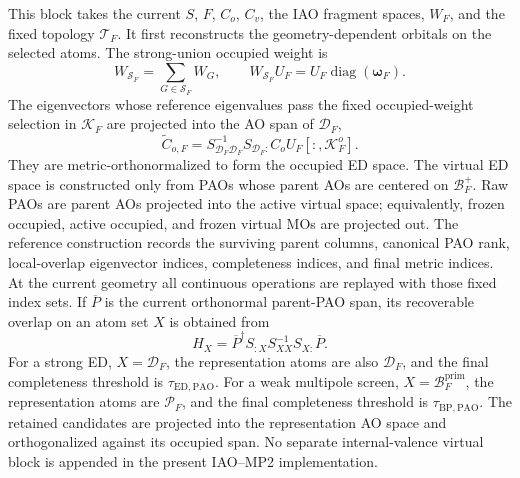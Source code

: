\documentclass[11pt]{article}
\begin{document}
This block takes the current $S$, $F$, $C_o$, $C_v$, the IAO fragment spaces,
$W_F$, and the fixed topology $\mathcal T_F$.  It first reconstructs the
geometry-dependent orbitals on the selected atoms.  The strong-union occupied
weight is
\begin{equation}
 W_{\mathcal S_F}=\sum_{G\in\mathcal S_F}W_G,
 \qquad
 W_{\mathcal S_F}U_F
 =U_F\operatorname{diag}(\boldsymbol\omega_F).
 \label{eq:workflow-strong-weight}
\end{equation}
The eigenvectors whose reference eigenvalues pass the fixed occupied-weight
selection in $\mathcal K_F$ are projected into the AO span of
$\mathcal D_F$,
\begin{equation}
 \widetilde C_{o,F}=
 S_{\mathcal D_F\mathcal D_F}^{-1}S_{\mathcal D_F:}
 C_oU_F[:,\mathcal K_F^{o}].
 \label{eq:workflow-ed-occupied-projection}
\end{equation}
They are metric-orthonormalized to form the occupied ED space.  The virtual ED
space is constructed only from PAOs whose parent AOs are centered on
$\mathcal B_F^+$.  Raw PAOs are parent AOs projected into the active virtual
space; equivalently, frozen occupied, active occupied, and frozen virtual MOs
are projected out.  The reference construction records the surviving parent
columns, canonical PAO rank, local-overlap eigenvector indices, completeness
indices, and final metric indices.  At the current geometry all continuous
operations are replayed with those fixed index sets.  If $\overline P$ is the
current orthonormal parent-PAO span, its recoverable overlap on an atom set
$X$ is obtained from
\begin{equation}
 H_X=\overline P^\dagger
 S_{:X}S_{XX}^{-1}S_{X:}\overline P.
 \label{eq:workflow-pao-recoverable-overlap}
\end{equation}
For a strong ED, $X=\mathcal D_F$, the representation atoms are also
$\mathcal D_F$, and the final completeness threshold is
$\tau_{\mathrm{ED,PAO}}$.  For a weak multipole screen,
$X=\mathcal B_F^{\mathrm{prim}}$, the representation atoms are
$\mathcal P_F$, and the final completeness threshold is
$\tau_{\mathrm{BP,PAO}}$.  The retained candidates are projected into the
representation AO space and orthogonalized against its occupied span.  No
separate internal-valence virtual block is appended in the present
IAO--MP2 implementation.
\end{document}
